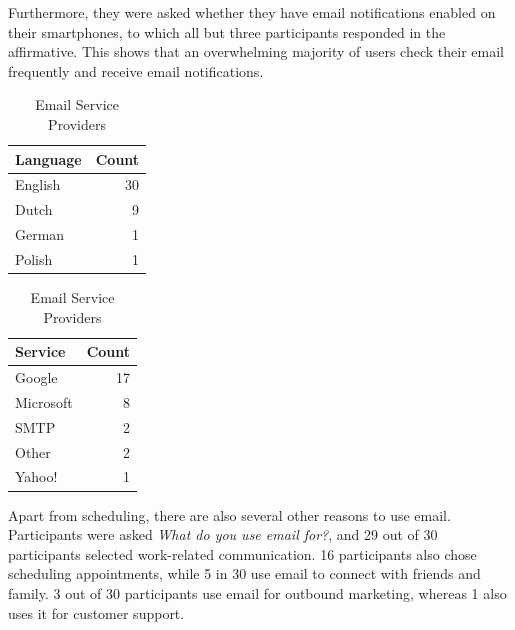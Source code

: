 \documentclass{article}
\begin{document}
Furthermore, they were asked whether they have email notifications enabled on their smartphones, to which all but three participants responded in the affirmative. This shows that an overwhelming majority of users check their email frequently and receive email notifications.

\begin{table}[!htb]
	\begin{minipage}{.5\linewidth}
		\caption{Email Languages}
		\centering
		\begin{tabular}{lr}
			\hline
			\textbf{Language} & \textbf{Count} \\
			\hline
			English           & 30             \\
			Dutch             & 9              \\
			German            & 1              \\
			Polish            & 1              \\
			\hline
		\end{tabular}
	\end{minipage}%
	\hspace{.1cm}
	\begin{minipage}{.5\linewidth}
		\centering
		\caption{Email Service Providers}
		\begin{tabular}{lr}
			\hline
			\textbf{Service} & \textbf{Count} \\
			\hline
			Google           & 17             \\
			Microsoft        & 8              \\
			SMTP             & 2              \\
			Other            & 2              \\
			Yahoo!           & 1              \\
			\hline
		\end{tabular}
	\end{minipage} 
\end{table}

Apart from scheduling, there are also several other reasons to use email. Participants were asked \emph{What do you use email for?}, and 29 out of 30 participants selected work-related communication. 16 participants also chose scheduling appointments, while 5 in 30 use email to connect with friends and family. 3 out of 30 participants use email for outbound marketing, whereas 1 also uses it for customer support.
\end{document}

